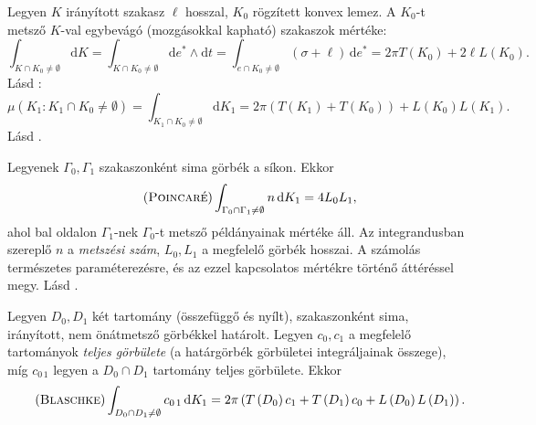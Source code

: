 \documentclass[DIV=15,appendixprefix]{scrreprt}
\theoremstyle{definition}
\theoremstyle{remark}
\begin{document}
Legyen $ K $ irányított szakasz $ \ell $ hosszal, $ K_{ 0 } $ rögzített konvex lemez. A
$ K_{ 0 } $-t metsző $ K $-val egybevágó (mozgásokkal kapható) szakaszok mértéke:
\begin{equation*}
	\int_{ K \cap K_{ 0 } \neq
	\emptyset} \mathrm{ d } K = \int_{ K \cap K_{ 0 } \neq \emptyset} \mathrm{ d }e^{ * } \wedge
	\mathrm{ d } t = \int_{ e \cap K_{ 0 } \neq \emptyset} \left( \sigma + \ell \right) \, \mathrm{ d } e^{ * } = 2 \pi T \left( K_{ 0 } \right) + 2 \ell L \left( K_{ 0 } \right).
\end{equation*}
%
Lásd \cite[6.~fejezet, 5.~szakasz, 93--95.~oldal]{Santalo}:
\begin{equation*}
	\mu \left( K_{ 1 } \colon K_{ 1 } \cap K_{ 0 } \neq \emptyset \right) = \int_{ K_{ 1 } \cap
	K_{ 0 } \neq \emptyset } \mathrm{ d } K_{ 1 } = 2 \pi \left( T \left( K_{ 1 } \right) + T
	\left( K_{ 0 } \right) \right) + L \left( K_{ 0 } \right) L \left( K_{ 1 } \right).
\end{equation*}
%
Lásd \cite[7.~fejezet, 2.~szakasz, 111.~oldal]{Santalo}.

Legyenek $ \Gamma_{ 0 },{} \Gamma_{ 1 } $ szakaszonként sima görbék a síkon. Ekkor
\begin{equation}\tag{\textsc{Poincaré}}
	\int_{ \Gamma_{ 0 } \cap \Gamma_{ 1 } \neq \emptyset } n \, \mathrm{ d } K_{ 1 } = 4 L_{ 0 }
	L_{ 1 },
\end{equation}
ahol bal oldalon $ \Gamma_{ 1 } $-nek $ \Gamma_{ 0 } $-t metsző példányainak mértéke áll. Az
integrandusban szereplő $ n $ a \emph{metszési szám}, $ L_{ 0 },{} L_{ 1 } $ a megfelelő görbék
hosszai. A számolás természetes paraméterezésre, és az ezzel kapcsolatos mértékre történő áttéréssel
megy.
%
Lásd \cite[7.~fejezet, 4.~szakasz, 114.~oldal]{Santalo}.

Legyen $ D_{ 0 },{} D_{ 1 } $ két tartomány (összefüggő és nyílt), szakaszonként sima, irányított,
nem önátmetsző görbékkel határolt. Legyen $ c_{ 0 },{} c_{ 1 } $ a megfelelő tartományok
\emph{teljes görbülete} (a határgörbék görbületei integráljainak összege), míg $ c_{ 0\,1 } $ legyen
a $ D_{ 0 } \cap D_{ 1 } $ tartomány teljes görbülete. Ekkor
\begin{equation}\tag{\textsc{Blaschke}}
	\int_{ D_{ 0 } \cap D_{ 1 } \neq \emptyset } c_{ 0\,1 } \, \mathrm{ d } K_{ 1 } = 2 \pi \left(
	T \left( D_{ 0 } \right) c_{ 1 } + T \left( D_{ 1 } \right) c_{ 0 } + L \left( D_{ 0 } \right)
	L \left( D_{ 1 } \right) \right).
\end{equation}
%
%
%
\appendix
{}
%
\end{document}
